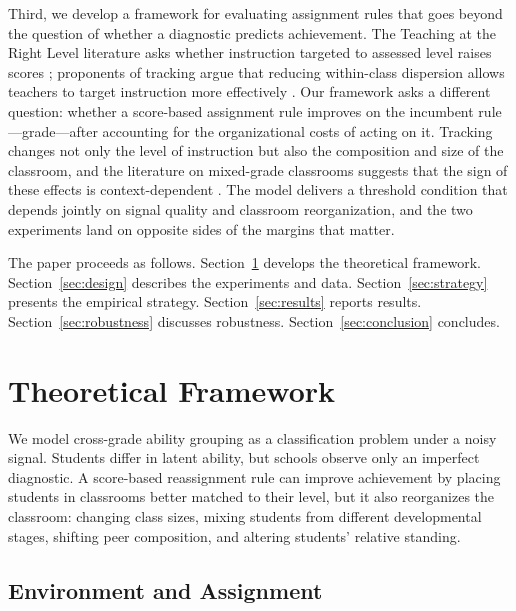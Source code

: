 \documentclass[11pt]{article}
\begin{document}
Third, we develop a framework for evaluating assignment rules that goes beyond the question of whether a diagnostic predicts achievement. The Teaching at the Right Level literature asks whether instruction targeted to assessed level raises scores \citep{banerjee2017proof,duflo2020experimental}; proponents of tracking argue that reducing within-class dispersion allows teachers to target instruction more effectively \citep{duflo2011peer}. Our framework asks a different question: whether a score-based assignment rule improves on the incumbent rule---grade---after accounting for the organizational costs of acting on it. Tracking changes not only the level of instruction but also the composition and size of the classroom, and the literature on mixed-grade classrooms suggests that the sign of these effects is context-dependent \citep{sims2008strategic,leuven2011classroom}. The model delivers a threshold condition that depends jointly on signal quality and classroom reorganization, and the two experiments land on opposite sides of the margins that matter.

The paper proceeds as follows. Section~\ref{sec:theory} develops the theoretical framework. Section~\ref{sec:design} describes the experiments and data. Section~\ref{sec:strategy} presents the empirical strategy. Section~\ref{sec:results} reports results. Section~\ref{sec:robustness} discusses robustness. Section~\ref{sec:conclusion} concludes.

\section{Theoretical Framework}
\label{sec:theory}

We model cross-grade ability grouping as a classification problem under a noisy signal. Students differ in latent ability, but schools observe only an imperfect diagnostic. A score-based reassignment rule can improve achievement by placing students in classrooms better matched to their level, but it also reorganizes the classroom: changing class sizes, mixing students from different developmental stages, shifting peer composition, and altering students' relative standing.

\subsection{Environment and Assignment}
\end{document}
